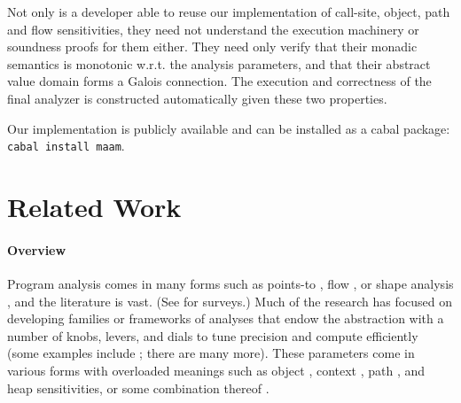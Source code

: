 \par

Not only is a developer able to reuse our implementation of call-site,
object, path and flow sensitivities, they need not understand the
execution machinery or soundness proofs for them either. They need only
verify that their monadic semantics is monotonic w.r.t. the analysis
parameters, and that their abstract value domain forms a Galois
connection. The execution and correctness of the final analyzer is
constructed automatically given these two properties.

\par

Our implementation is publicly available and can be installed as a cabal
package: {\small\tt cabal install maam}.

\par

\section{Related Work}\label{related-work}

\par

\paragraph{Overview}

\par

Program analysis comes in many forms such as points-to
\cite{dvanhorn:Andersen1994Program}, flow
\cite{dvanhorn:Jones:1981:LambdaFlow}, or shape analysis
\cite{dvanhorn:Chase1990Analysis}, and the literature is vast. (See
\citet{dvanhorn:hind-paste01,dvanhorn:Midtgaard2012Controlflow} for
surveys.) Much of the research has focused on developing families or
frameworks of analyses that endow the abstraction with a number of
knobs, levers, and dials to tune precision and compute efficiently (some
examples include
\citet{dvanhorn:Shivers:1991:CFA, dvanhorn:nielson-nielson-popl97,
dvanhorn:Milanova2005Parameterized, davdar:van-horn:2010:aam}; there are
many more). These parameters come in various forms with overloaded
meanings such as object \cite{dvanhorn:Milanova2005Parameterized,
dvanhorn:Smaragdakis2011Pick}, context
\cite{dvanhorn:Sharir:Interprocedural,
dvanhorn:Shivers:1991:CFA}, path \cite{davdar:das:2002:esp}, and heap
\cite{davdar:van-horn:2010:aam} sensitivities, or some combination
thereof \cite{dvanhorn:Kastrinis2013Hybrid}.

